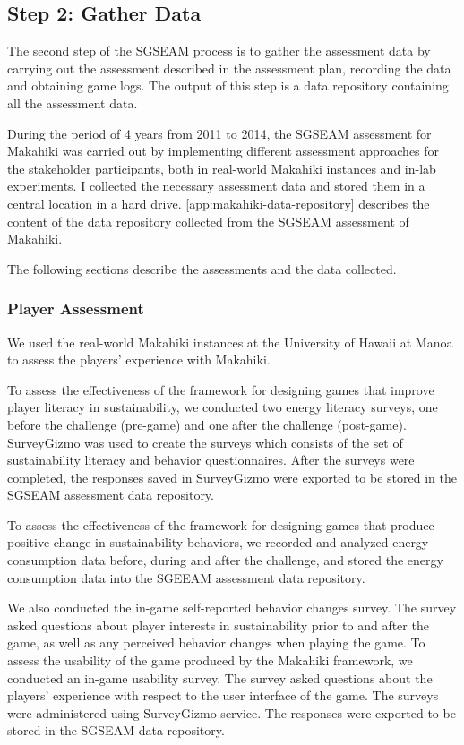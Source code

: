 \subsection{Step 2: Gather Data}

The second step of the SGSEAM process is to gather the assessment data by carrying out the assessment described in the assessment plan, recording the data and obtaining game logs. The output of this step is a data repository containing all the assessment data. 

During the period of 4 years from 2011 to 2014, the SGSEAM assessment for Makahiki was carried out by implementing different assessment approaches for the stakeholder participants, both in real-world Makahiki instances and in-lab experiments. I collected the necessary assessment data and stored them in a central location in a hard drive. \autoref{app:makahiki-data-repository} describes the content of the data repository collected from the SGSEAM assessment of Makahiki. 

The following sections describe the assessments and the data collected. 

\subsubsection{Player Assessment}

We used the real-world Makahiki instances at the University of Hawaii at Manoa to assess the players' experience with Makahiki. 

To assess the effectiveness of the framework for designing games that improve player literacy in sustainability, we
conducted two energy literacy surveys, one before the challenge (pre-game) and one after
the challenge (post-game). SurveyGizmo was used to create the surveys which consists of the set of sustainability literacy and behavior questionnaires. 
After the surveys were completed, the responses saved in SurveyGizmo were exported to be stored in the SGSEAM assessment data repository.

To assess the effectiveness of the framework for designing games that produce positive change in sustainability
behaviors, we recorded and analyzed energy consumption data before, during and after the
challenge, and stored the energy consumption data into the SGEEAM assessment data repository. 

We also conducted the in-game self-reported behavior changes survey. The survey asked questions about player interests in sustainability prior to and after the game, as well as any perceived behavior changes when playing the game.  To assess the usability of the game produced by the Makahiki framework, we conducted an in-game usability survey. The survey asked questions about the players' experience with respect to the user interface of the game. The surveys were administered using SurveyGizmo service. The responses were exported to be stored in the SGSEAM data repository.

